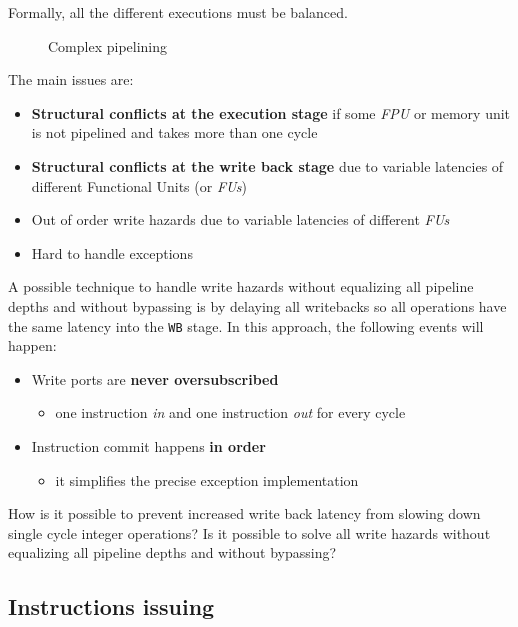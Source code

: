 \documentclass[english]{article}
\begin{document}
Formally, all the different executions must be balanced.

\begin{figure}[htbp]
  \bigskip
  \centering
  \caption{Complex pipelining}
  \label{fig:complex-pipelining-2}
  \bigskip
\end{figure}

\bigskip
The main issues are:
\begin{itemize}
  \item \textbf{Structural conflicts at the execution stage} if some \textit{FPU} or memory unit is not pipelined and takes more than one cycle
  \item \textbf{Structural conflicts at the write back stage} due to variable latencies of different Functional Units (or \textit{FUs})
  \item Out of order write hazards due to variable latencies of different \textit{FUs}
  \item Hard to handle exceptions
\end{itemize}

A possible technique to handle write hazards without equalizing all pipeline depths and without bypassing is by delaying all writebacks so all operations have the same latency into the \texttt{WB} stage.
In this approach, the following events will happen:

\begin{itemize}
  \item Write ports are \textbf{never oversubscribed}
        \begin{itemize}
          \item one instruction \textit{in} and one instruction \textit{out} for every cycle
        \end{itemize}
  \item Instruction commit happens \textbf{in order}
        \begin{itemize}
          \item it simplifies the precise exception implementation
        \end{itemize}
\end{itemize}

How is it possible to prevent increased write back latency from slowing down single cycle integer operations?
Is it possible to solve all write hazards without equalizing all pipeline depths and without bypassing?

\subsection{Instructions issuing}
\label{sec:instructions-issuing}
\end{document}
